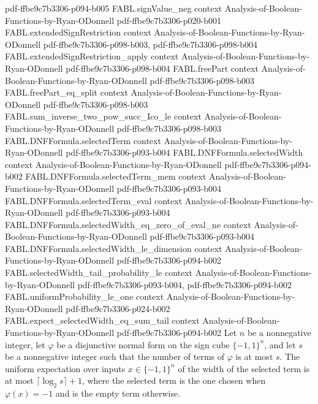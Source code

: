 \begin{theorem}
  {pdf-ffbe9c7b3306-p094-b005}
\proofstep
  {FABL.signValue_neg}
  {context}
  {Analysis-of-Boolean-Functions-by-Ryan-ODonnell}
  {pdf-ffbe9c7b3306-p020-b001}
\proofstep
  {FABL.extendedSignRestriction}
  {context}
  {Analysis-of-Boolean-Functions-by-Ryan-ODonnell}
  {pdf-ffbe9c7b3306-p098-b003,
    pdf-ffbe9c7b3306-p098-b004}
\proofstep
  {FABL.extendedSignRestriction_apply}
  {context}
  {Analysis-of-Boolean-Functions-by-Ryan-ODonnell}
  {pdf-ffbe9c7b3306-p098-b004}
\proofstep
  {FABL.freePart}
  {context}
  {Analysis-of-Boolean-Functions-by-Ryan-ODonnell}
  {pdf-ffbe9c7b3306-p098-b003}
\proofstep
  {FABL.freePart_eq_split}
  {context}
  {Analysis-of-Boolean-Functions-by-Ryan-ODonnell}
  {pdf-ffbe9c7b3306-p098-b003}
\proofstep
  {FABL.sum_inverse_two_pow_succ_Ico_le}
  {context}
  {Analysis-of-Boolean-Functions-by-Ryan-ODonnell}
  {pdf-ffbe9c7b3306-p098-b003}
\proofstep
  {FABL.DNFFormula.selectedTerm}
  {context}
  {Analysis-of-Boolean-Functions-by-Ryan-ODonnell}
  {pdf-ffbe9c7b3306-p093-b004}
\proofstep
  {FABL.DNFFormula.selectedWidth}
  {context}
  {Analysis-of-Boolean-Functions-by-Ryan-ODonnell}
  {pdf-ffbe9c7b3306-p094-b002}
\proofstep
  {FABL.DNFFormula.selectedTerm_mem}
  {context}
  {Analysis-of-Boolean-Functions-by-Ryan-ODonnell}
  {pdf-ffbe9c7b3306-p093-b004}
\proofstep
  {FABL.DNFFormula.selectedTerm_eval}
  {context}
  {Analysis-of-Boolean-Functions-by-Ryan-ODonnell}
  {pdf-ffbe9c7b3306-p093-b004}
\proofstep
  {FABL.DNFFormula.selectedWidth_eq_zero_of_eval_ne}
  {context}
  {Analysis-of-Boolean-Functions-by-Ryan-ODonnell}
  {pdf-ffbe9c7b3306-p093-b004}
\proofstep
  {FABL.DNFFormula.selectedWidth_le_dimension}
  {context}
  {Analysis-of-Boolean-Functions-by-Ryan-ODonnell}
  {pdf-ffbe9c7b3306-p094-b002}
\proofstep
  {FABL.selectedWidth_tail_probability_le}
  {context}
  {Analysis-of-Boolean-Functions-by-Ryan-ODonnell}
  {pdf-ffbe9c7b3306-p093-b004,
    pdf-ffbe9c7b3306-p094-b002}
\proofstep
  {FABL.uniformProbability_le_one}
  {context}
  {Analysis-of-Boolean-Functions-by-Ryan-ODonnell}
  {pdf-ffbe9c7b3306-p024-b002}
\proofstep
  {FABL.expect_selectedWidth_eq_sum_tail}
  {context}
  {Analysis-of-Boolean-Functions-by-Ryan-ODonnell}
  {pdf-ffbe9c7b3306-p094-b002}
Let $n$ be a nonnegative integer, let $\varphi$ be a disjunctive normal form on the sign
cube $\{−1,1\}^n$, and let $s$ be a nonnegative integer such that the number of terms of
$\varphi$ is at most $s$. The uniform expectation over inputs $x\in\{−1,1\}^n$ of the
width of the selected term is at most $\lceil\log_2 s\rceil+1$, where the selected term
is the one chosen when $\varphi(x)=-1$ and is the empty term otherwise.
\end{theorem}


